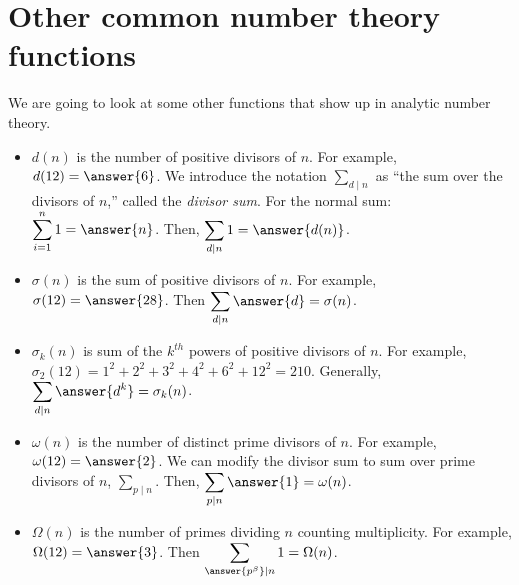 \documentclass{ximera}
\begin{document}
\section{Other common number theory functions}
We are going to look at some other functions that show up in analytic number theory. 
\begin{itemize}
 \item $d(n)$ is the number of positive divisors of $n$. For example, $d(12)=\answer{6}$. We introduce the notation $\displaystyle\sum_{d\mid n}$ as ``the sum over the divisors of $n$,'' called the \emph{divisor sum}. For the normal sum: $\displaystyle\sum_{i=1}^n 1=\answer{n}$. Then, $\displaystyle\sum_{d\mid n}1=\answer{d(n)}$.
 
 \item $\sigma(n)$ is the sum of positive divisors of $n$. For example, $\sigma(12)=\answer{28}$. Then $\displaystyle\sum_{d\mid n}\answer{d}=\sigma(n)$.
 
 \item $\sigma_k(n)$ is sum of the $k^{th}$ powers of positive divisors of $n$. For example, $\sigma_2(12)=1^2+2^2+3^2+4^2+6^2+12^2=210.$ Generally, $\displaystyle\sum_{d\mid n}\answer{d^k}=\sigma_k(n)$.

 \item $\omega(n)$ is the number of distinct prime divisors of $n$. For example, $\omega(12)=\answer{2}$. We can modify the divisor sum to sum over prime divisors of $n$,  $\displaystyle\sum_{p\mid n}$. Then, $\displaystyle\sum_{p\mid n} \answer{1}=\omega(n)$.
 
 \item $\Omega(n)$ is the number of primes dividing $n$ counting multiplicity. For example, $\Omega(12)=\answer{3}$. Then $\displaystyle\sum_{\answer{p^\beta}\mid n} 1=\Omega(n)$.

\end{itemize}
\end{document}
